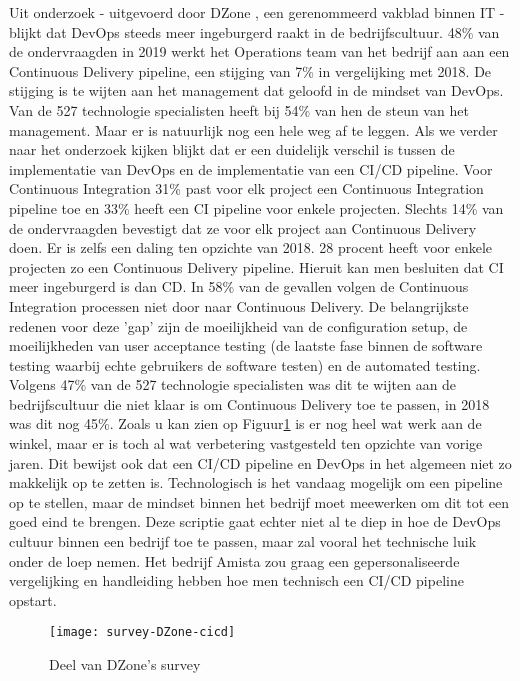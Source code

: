 Uit onderzoek - uitgevoerd door DZone , een gerenommeerd vakblad binnen IT - blijkt dat DevOps steeds meer ingeburgerd raakt in de bedrijfscultuur. 48\% van de ondervraagden in 2019 werkt het Operations team van het bedrijf aan aan een Continuous Delivery pipeline, een stijging van 7\% in vergelijking met 2018.
De stijging is te wijten aan het management dat geloofd in de mindset van DevOps. Van de 527 technologie specialisten heeft bij 54\% van hen de steun van het management. Maar er is natuurlijk nog een hele weg af te leggen.
Als we verder naar het onderzoek kijken blijkt dat er een duidelijk verschil is tussen de implementatie van DevOps en de implementatie van een CI/CD pipeline. 
Voor Continuous Integration 31\% past voor elk project een Continuous Integration pipeline toe en 33\% heeft een CI pipeline voor enkele projecten.
Slechts 14\% van de ondervraagden bevestigt dat ze voor elk project aan Continuous Delivery doen. Er is zelfs een daling ten opzichte van 2018.
28 procent heeft voor enkele projecten zo een Continuous Delivery pipeline. 
Hieruit kan men besluiten dat CI meer ingeburgerd is dan CD. In 58\% van de gevallen volgen de Continuous Integration processen niet door naar Continuous Delivery. De belangrijkste redenen voor deze 'gap' zijn de moeilijkheid van de configuration setup, de moeilijkheden van user acceptance testing (de laatste fase binnen de software testing waarbij echte gebruikers de software testen) en de automated testing.
Volgens 47\% van de 527 technologie specialisten was dit te wijten aan de bedrijfscultuur die niet klaar is om Continuous Delivery toe te passen, in 2018 was dit nog 45\%.
Zoals u kan zien op Figuur\ref{img-survey-cicd} is er nog heel wat werk aan de winkel, maar er is toch al wat verbetering vastgesteld ten opzichte van vorige jaren. Dit bewijst ook dat een CI/CD pipeline en DevOps in het algemeen niet zo makkelijk op te zetten is. Technologisch is het vandaag mogelijk om een pipeline op te stellen, maar de mindset binnen het bedrijf moet meewerken om dit tot een goed eind te brengen.
Deze scriptie gaat echter niet al te diep in hoe de DevOps cultuur binnen een bedrijf toe te passen, maar zal vooral het technische luik onder de loep nemen. Het bedrijf Amista zou graag een gepersonaliseerde vergelijking en handleiding hebben hoe men technisch een CI/CD pipeline opstart.

\begin{figure}	
    \texttt{[image: survey-DZone-cicd]}
    \caption{Deel van DZone's survey ~\autocite{}} \label{img-survey-cicd}
\end{figure}

